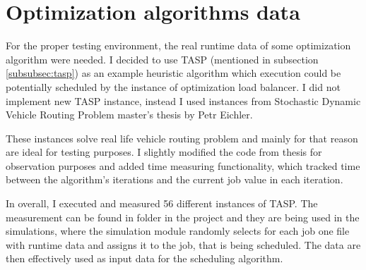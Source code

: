 \section{Optimization algorithms data}\label{sec:optimization-algorithms-data}
For the proper testing environment,
the real runtime data of some optimization algorithm were needed.
I decided to use TASP (mentioned in subsection \ref{subsubsec:tasp}) as an example heuristic algorithm
which execution could be potentially scheduled by the instance of optimization load balancer.
I did not implement new TASP instance,
instead I used instances from Stochastic Dynamic Vehicle Routing Problem master's thesis by Petr Eichler\cite{Eichler:Petr:2003}.

These instances solve real life vehicle routing problem 
and mainly for that reason are ideal for testing purposes.
I slightly modified the code from thesis for observation purposes
and added time measuring functionality,
which tracked time between the algorithm's iterations and the current job value in each iteration.

In overall,
I executed and measured 56 different instances of TASP.
The measurement can be found in  folder in the project
and they are being used in the simulations,
where the simulation module randomly selects for each job one file with runtime data
and assigns it to the job, that is being scheduled.
The data are then effectively used as input data for the scheduling algorithm.